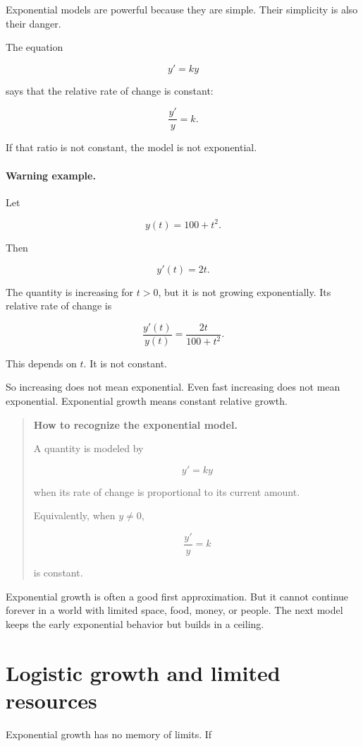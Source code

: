 Exponential models are powerful because they are simple.  Their simplicity is also
their danger.

The equation

\[
y'=ky
\]

says that the relative rate of change is constant:

\[
\frac{y'}{y}=k.
\]

If that ratio is not constant, the model is not exponential.

\paragraph{Warning example.}
Let

\[
y(t)=100+t^2.
\]

Then

\[
y'(t)=2t.
\]

The quantity is increasing for \(t>0\), but it is not growing exponentially.  Its relative
rate of change is

\[
\frac{y'(t)}{y(t)}
=
\frac{2t}{100+t^2}.
\]

This depends on \(t\).  It is not constant.

So increasing does not mean exponential.  Even fast increasing does not mean
exponential.  Exponential growth means constant relative growth.

\begin{quote}
\textbf{How to recognize the exponential model.}

A quantity is modeled by

\[
y'=ky
\]

when its rate of change is proportional to its current amount.

Equivalently, when \(y\neq0\),

\[
\frac{y'}{y}=k
\]

is constant.
\end{quote}

Exponential growth is often a good first approximation.  But it cannot continue
forever in a world with limited space, food, money, or people.  The next model keeps
the early exponential behavior but builds in a ceiling.

\section{Logistic growth and limited resources}
\label{sec:logistic-growth-limited-resources}

Exponential growth has no memory of limits.  If

